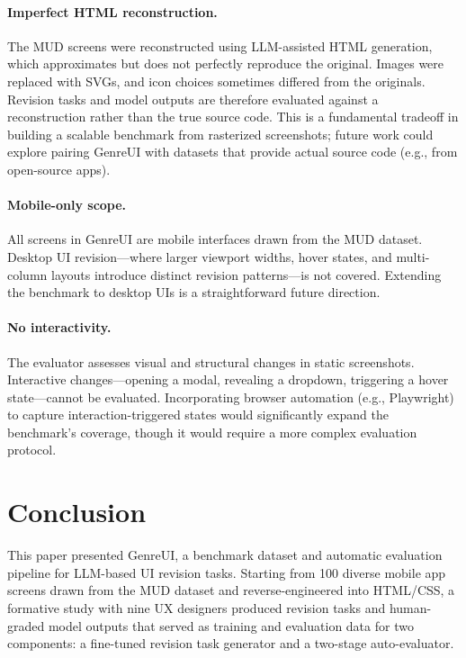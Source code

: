 \documentclass[sigconf,nonacm]{acmart}
\begin{document}
\paragraph{Imperfect HTML reconstruction.}
The MUD screens were reconstructed using LLM-assisted HTML generation, which approximates but does not perfectly reproduce the original. Images were replaced with SVGs, and icon choices sometimes differed from the originals. Revision tasks and model outputs are therefore evaluated against a reconstruction rather than the true source code. This is a fundamental tradeoff in building a scalable benchmark from rasterized screenshots; future work could explore pairing GenreUI with datasets that provide actual source code (e.g., from open-source apps).

\paragraph{Mobile-only scope.}
All screens in GenreUI are mobile interfaces drawn from the MUD dataset. Desktop UI revision—where larger viewport widths, hover states, and multi-column layouts introduce distinct revision patterns—is not covered. Extending the benchmark to desktop UIs is a straightforward future direction.

\paragraph{No interactivity.}
The evaluator assesses visual and structural changes in static screenshots. Interactive changes—opening a modal, revealing a dropdown, triggering a hover state—cannot be evaluated. Incorporating browser automation (e.g., Playwright) to capture interaction-triggered states would significantly expand the benchmark's coverage, though it would require a more complex evaluation protocol.

\section{Conclusion}
\label{sec:conclusion}

This paper presented GenreUI, a benchmark dataset and automatic evaluation pipeline for LLM-based UI revision tasks. Starting from 100 diverse mobile app screens drawn from the MUD dataset and reverse-engineered into HTML/CSS, a formative study with nine UX designers produced revision tasks and human-graded model outputs that served as training and evaluation data for two components: a fine-tuned revision task generator and a two-stage auto-evaluator.
\end{document}
